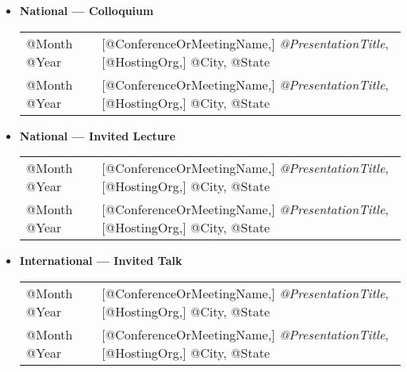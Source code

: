 \documentclass[10pt]{article}
\begin{document}
\begin{itemize}
\item[] \textbf{National --- Colloquium}
\\[1.3ex]
\begin{tabular}{l@{\quad\ }p{34em}} 
 @Month @Year 
 & [@ConferenceOrMeetingName,] \emph{@PresentationTitle},
   [@HostingOrg,]
   @City, @State
   \smallskip \\
 @Month @Year 
 & [@ConferenceOrMeetingName,] \emph{@PresentationTitle},
   [@HostingOrg,]
   @City, @State
\end{tabular}

\item[] \textbf{National --- Invited Lecture}
\\[1.3ex]
\begin{tabular}{l@{\quad\ }p{34em}} 
 @Month @Year 
 & [@ConferenceOrMeetingName,] \emph{@PresentationTitle},
   [@HostingOrg,]
   @City, @State
   \smallskip \\
 @Month @Year 
 & [@ConferenceOrMeetingName,] \emph{@PresentationTitle},
   [@HostingOrg,]
   @City, @State
\end{tabular}


\item[] \textbf{International --- Invited Talk}
\\[1.3ex]
\begin{tabular}{l@{\quad\ }p{34em}} 
 @Month @Year 
 & [@ConferenceOrMeetingName,] \emph{@PresentationTitle},
   [@HostingOrg,]
   @City, @State
   \smallskip \\
 @Month @Year 
 & [@ConferenceOrMeetingName,] \emph{@PresentationTitle},
   [@HostingOrg,]
   @City, @State
\end{tabular}


\end{itemize}
\end{document}
